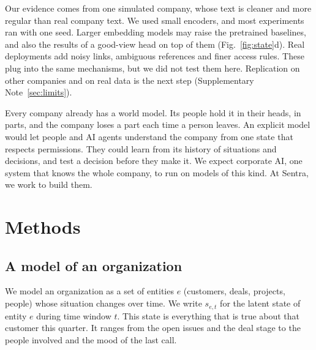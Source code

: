 \documentclass[11pt]{article}
\begin{document}
Our evidence comes from one simulated company, whose text is cleaner and more regular than real company text. We used small encoders, and most experiments ran with one seed. Larger embedding models may raise the pretrained baselines, and also the results of a good-view head on top of them (Fig.~\ref{fig:state}d). Real deployments add noisy links, ambiguous references and finer access rules. These plug into the same mechanisms, but we did not test them here. Replication on other companies and on real data is the next step (Supplementary Note~\ref{sec:limits}).

Every company already has a world model. Its people hold it in their heads, in parts, and the company loses a part each time a person leaves. An explicit model would let people and AI agents understand the company from one state that respects permissions. They could learn from its history of situations and decisions, and test a decision before they make it. We expect corporate AI, one system that knows the whole company, to run on models of this kind. At Sentra, we work to build them.

\section{Methods}

\subsection{A model of an organization}
We model an organization as a set of entities $e$ (customers, deals, projects, people) whose situation changes over time. We write $s_{e,t}$ for the latent state of entity $e$ during time window $t$. This state is everything that is true about that customer this quarter. It ranges from the open issues and the deal stage to the people involved and the mood of the last call.
\end{document}
